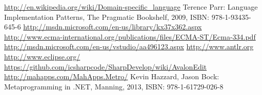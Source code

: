 \documentclass[a4paper,12pt]{report}
\begin{document}



\listoffigures

\begin{thebibliography}{9}
 \url{http://en.wikipedia.org/wiki/Domain-specific_language}
 Terence Parr: Language Implementation Patterns, The Pragmatic Bookshelf, 2009, ISBN: 978-1-93435-645-6
 \url{http://msdn.microsoft.com/en-us/library/kx37x362.aspx}
 \url{http://www.ecma-international.org/publications/files/ECMA-ST/Ecma-334.pdf}
 \url{http://msdn.microsoft.com/en-us/vstudio/aa496123.aspx}
 \url{http://www.antlr.org}
 \url{http://www.eclipse.org/}
 \url{https://github.com/icsharpcode/SharpDevelop/wiki/AvalonEdit}
 \url{http://mahapps.com/MahApps.Metro/}
 Kevin Hazzard, Jason Bock: Metaprogramming in .NET, Manning, 2013, ISBN: 978-1-61729-026-8
\end{thebibliography}
\end{document}
